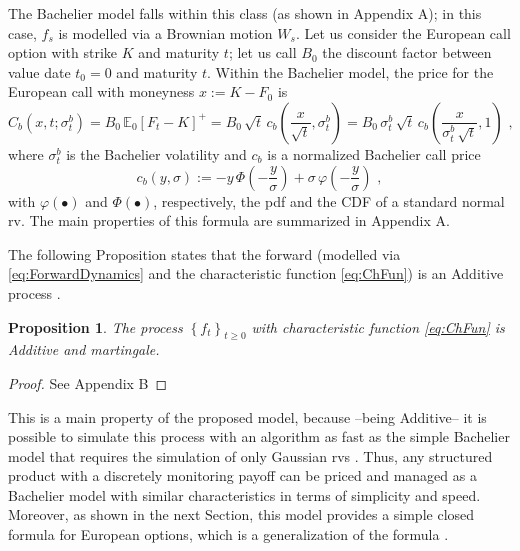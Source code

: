 \documentclass[12pt]{article}
\newtheorem{proposition}[theorem]{Proposition}
\theoremstyle{definition}
\theoremstyle{remark}
\numberwithin{theorem}{section}
\numberwithin{proposition}{section}
\numberwithin{lemma}{section}
\numberwithin{corollary}{section}
\numberwithin{definition}{section}
\numberwithin{remark}{section}
\numberwithin{example}{section}
\newcommand{\E}{\mathbb{E}}
\newcommand{\be}{\begin{equation}}
\newcommand{\en}{\end{equation}}
\begin{document}
The Bachelier model falls within this class (as shown in Appendix A);
in this case, $f_s$ is modelled via a Brownian motion $W_s$.
Let us consider the European call option with strike $K$ and maturity $t$; let us call  
$B_0$ the discount factor between value date $t_0=0$ and maturity $t$.
Within the Bachelier model,
the price for the European call with moneyness $x := K - F_0 $ is 
\be
\label{eq:BachelierFormula}
C_b(x, t; \sigma^b_t) = B_0  \,  \E_0 \left[  F_t - K \right]^+  =
B_0  \,   \sqrt{t} \, c_b\left(  \frac{x}{\sqrt{t}}, \sigma^b_t \right) = 
B_0  \,  \sigma^b_t \, \sqrt{t} \, c_b\left(  \frac{x}{\sigma^b_t \, \sqrt{t}}, 1 \right) \, \, ,
\en
where $\sigma^b_t$ is the Bachelier volatility and $c_b$ is a normalized Bachelier call price
\be
\displaystyle c_b(y, \sigma) := - y \, \Phi \left( - \frac{y}{\sigma} \right) + \sigma \, 
\varphi \left( - \frac{y}{\sigma} \right) \,\,,
\label{eq:BasicFormula}
\en
with ${\varphi} ( \bullet )$  and ${\Phi} ( \bullet )$, respectively, the pdf and the CDF of a standard normal rv.
The main properties of this formula are summarized in Appendix A.

\bigskip

The following Proposition states that  the forward 
(modelled via \eqref{eq:ForwardDynamics} and the characteristic function \eqref{eq:ChFun}) is an Additive process \citep{Sato}.

\begin{proposition} 
\label{th:f_Additive}
The process $ \left\{f_t \right\}_{t\geq 0}$ with characteristic function \eqref{eq:ChFun}
 is Additive and martingale.
\end{proposition}
\begin{proof}
    See Appendix B
\end{proof}

This is a main property of the proposed model, because --being Additive-- it is possible to simulate this process 
with an algorithm as fast as the simple Bachelier model that requires the simulation of only Gaussian rvs
\citep[see, e.g.,][]{azzone2023fast}. Thus, any structured product with a discretely monitoring payoff can be priced and 
managed as a Bachelier model with similar characteristics in terms of simplicity and speed.
\\
Moreover, as shown in the next Section, this model provides a simple closed formula for European options, which is a generalization 
of the \citet{lewis2001} formula \citep[see, e.g.,][]{lee2004option}.
\end{document}

